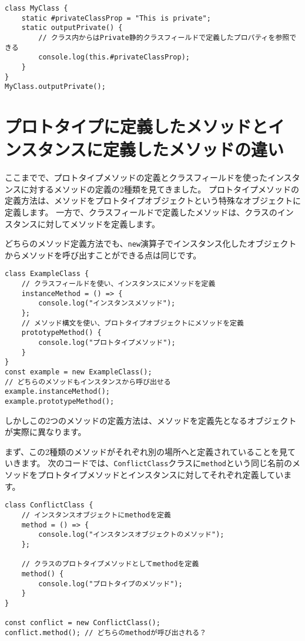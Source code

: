 \begin{lstlisting}
class MyClass {
    static #privateClassProp = "This is private";
    static outputPrivate() {
        // クラス内からはPrivate静的クラスフィールドで定義したプロパティを参照できる
        console.log(this.#privateClassProp);
    }
}
MyClass.outputPrivate();
\end{lstlisting}

\hypertarget{two-instance-method-definition}{%
\section{プロトタイプに定義したメソッドとインスタンスに定義したメソッドの違い}\label{two-instance-method-definition}}

ここまでで、プロトタイプメソッドの定義とクラスフィールドを使ったインスタンスに対するメソッドの定義の2種類を見てきました。
プロトタイプメソッドの定義方法は、メソッドをプロトタイプオブジェクトという特殊なオブジェクトに定義します。
一方で、クラスフィールドで定義したメソッドは、クラスのインスタンスに対してメソッドを定義します。

どちらのメソッド定義方法でも、\texttt{new}演算子でインスタンス化したオブジェクトからメソッドを呼び出すことができる点は同じです。

\begin{lstlisting}
class ExampleClass {
    // クラスフィールドを使い、インスタンスにメソッドを定義
    instanceMethod = () => {
        console.log("インスタンスメソッド");
    };
    // メソッド構文を使い、プロトタイプオブジェクトにメソッドを定義
    prototypeMethod() {
        console.log("プロトタイプメソッド");
    }
}
const example = new ExampleClass();
// どちらのメソッドもインスタンスから呼び出せる
example.instanceMethod();
example.prototypeMethod();
\end{lstlisting}

しかしこの2つのメソッドの定義方法は、メソッドを定義先となるオブジェクトが実際に異なります。

まず、この2種類のメソッドがそれぞれ別の場所へと定義されていることを見ていきます。
次のコードでは、\texttt{ConflictClass}クラスに\texttt{method}という同じ名前のメソッドをプロトタイプメソッドとインスタンスに対してそれぞれ定義しています。

\begin{lstlisting}
class ConflictClass {
    // インスタンスオブジェクトにmethodを定義
    method = () => {
        console.log("インスタンスオブジェクトのメソッド");
    };

    // クラスのプロトタイプメソッドとしてmethodを定義
    method() {
        console.log("プロトタイプのメソッド");
    }
}

const conflict = new ConflictClass();
conflict.method(); // どちらのmethodが呼び出される？
\end{lstlisting}

